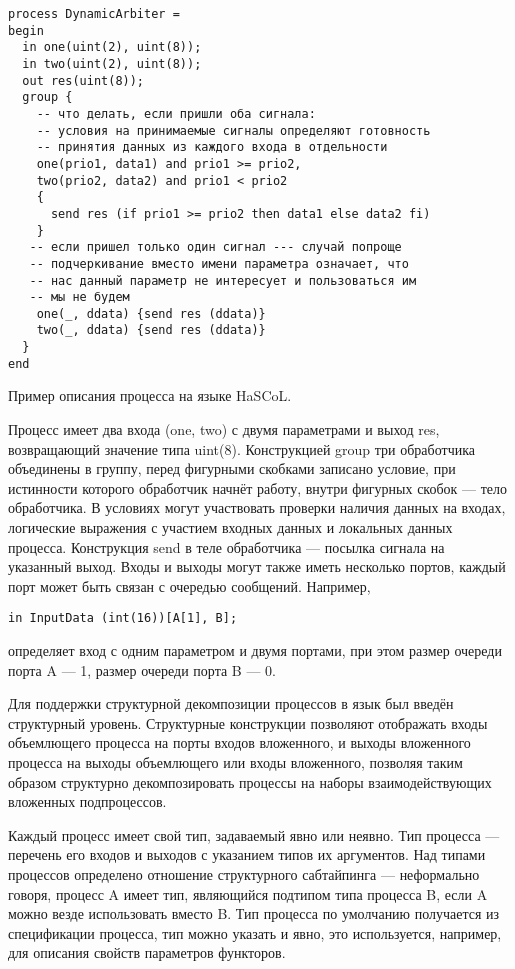 \begin{listing}
\begin{verbatim}
process DynamicArbiter =
begin
  in one(uint(2), uint(8));
  in two(uint(2), uint(8));
  out res(uint(8));
  group {
    -- что делать, если пришли оба сигнала:
    -- условия на принимаемые сигналы определяют готовность
    -- принятия данных из каждого входа в отдельности
    one(prio1, data1) and prio1 >= prio2,
    two(prio2, data2) and prio1 < prio2
    {
      send res (if prio1 >= prio2 then data1 else data2 fi)
    }
   -- если пришел только один сигнал --- случай попроще
   -- подчеркивание вместо имени параметра означает, что
   -- нас данный параметр не интересует и пользоваться им
   -- мы не будем
    one(_, ddata) {send res (ddata)}
    two(_, ddata) {send res (ddata)}
  }
end
\end{verbatim}
\caption{Пример описания процесса на языке HaSCoL.}
\label{listing:process}
\end{listing}

Процесс имеет два входа (one, two) с двумя параметрами и выход res, возвращающий значение 
типа uint(8). Конструкцией group три обработчика объединены в группу, перед фигурными 
скобками записано условие, при истинности которого обработчик начнёт работу, внутри 
фигурных скобок --- тело обработчика. В условиях могут участвовать проверки наличия 
данных на входах, логические выражения с участием входных данных и локальных данных 
процесса. Конструкция send в теле обработчика --- посылка сигнала на указанный выход. 
Входы и выходы могут также иметь несколько портов, каждый порт может быть связан с 
очередью сообщений. Например,

\begin{verbatim}
in InputData (int(16))[A[1], B];
\end{verbatim}
определяет вход с одним параметром и двумя портами, при этом размер очереди порта 
A --- 1, размер очереди порта B --- 0.

Для поддержки структурной декомпозиции процессов в язык был введён структурный уровень. 
Структурные конструкции позволяют отображать входы объемлющего процесса на порты входов 
вложенного, и выходы вложенного процесса на выходы объемлющего или входы вложенного, 
позволяя таким образом структурно декомпозировать процессы на наборы взаимодействующих 
вложенных подпроцессов.

Каждый процесс имеет свой тип, задаваемый явно или неявно. Тип процесса --- перечень 
его входов и выходов с указанием типов их аргументов. Над типами процессов определено 
отношение структурного сабтайпинга --- неформально говоря, процесс A имеет тип, являющийся 
подтипом типа процесса B, если A можно везде использовать вместо B. Тип процесса по 
умолчанию получается из спецификации процесса, тип можно указать и явно, это используется, 
например, для описания свойств параметров функторов.


